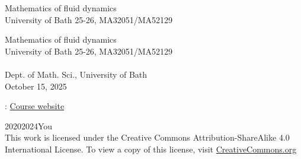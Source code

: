 \documentclass[oneside,10pt,]{book}
\newcommand{\titlepagefont}{\relax}
\numberwithin{equation}{section}
\begin{document}
\raggedbottom
\frontmatter
\thispagestyle{empty}
{\titlepagefont\centering
\vspace*{0.28\textheight}
{\Huge Mathematics of fluid dynamics}\\[2\baselineskip]
{\LARGE University of Bath 25-26, MA32051\slash{}MA52129}\\
}
\clearpage
\thispagestyle{empty}
{\titlepagefont\centering
\vspace*{0.14\textheight}
{\Huge Mathematics of fluid dynamics}\\[\baselineskip]
{\LARGE University of Bath 25-26, MA32051\slash{}MA52129}\\[3\baselineskip]
{\Large  }\\[0.5\baselineskip]
{\Large Dept. of Math. Sci., University of Bath}\\[3\baselineskip]
{\Large October 15, 2025}\\}
\clearpage
\thispagestyle{empty}
: \href{https://trinh.github.io/BathMAFluids/}{Course website}\par\medskip
\noindent\textcopyright{}2020\textendash{}2024\quad{}You\\[0.5\baselineskip]
This work is licensed under the Creative Commons Attribution-ShareAlike 4.0 International License. To view a copy of this license, visit \href{http://creativecommons.org/licenses/by-sa/4.0/}{CreativeCommons.org}\par\medskip
{}
\null\clearpage
%
%
\typeout{************************************************}
\typeout{************************************************}
%
\end{document}
